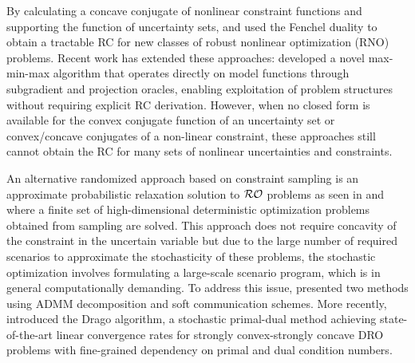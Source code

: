 \documentclass[journal,twoside,web]{ieeecolor}
\begin{document}
{\color{blue} By calculating a concave conjugate of nonlinear constraint functions and supporting the function of uncertainty sets, \cite{bental20152} and \cite{gorissen20152} used the Fenchel duality to obtain a tractable RC for new classes of robust nonlinear optimization (RNO) problems. Recent work has extended these approaches: \cite{maxminmax2024} developed a novel max-min-max algorithm that operates directly on model functions through subgradient and projection oracles, enabling exploitation of problem structures without requiring explicit RC derivation. However, when no closed form is available for the convex conjugate function of an uncertainty set or convex/concave conjugates of a non-linear constraint, these approaches still cannot obtain the RC for many sets of nonlinear uncertainties and constraints.}

{\color{blue} An alternative randomized approach based on constraint sampling is an approximate probabilistic relaxation solution to ${\cal RO}$ problems as seen in \cite{calafiore2004} and \cite{calafiore2010} where a finite set of high-dimensional deterministic optimization problems obtained from sampling are solved. This approach does not require concavity of the constraint in the uncertain variable but due to the large number of required scenarios to approximate the stochasticity of these problems, the stochastic optimization involves formulating a large-scale scenario program, which is in general computationally demanding. To address this issue, \cite{rostampour2021} presented two methods using ADMM decomposition and soft communication schemes. More recently, \cite{drago2024} introduced the Drago algorithm, a stochastic primal-dual method achieving state-of-the-art linear convergence rates for strongly convex-strongly concave DRO problems with fine-grained dependency on primal and dual condition numbers.}
\end{document}
